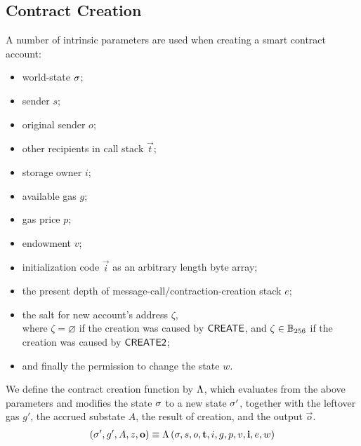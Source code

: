 \subsection{Contract Creation}
\label{sec:creation}

A number of intrinsic parameters are used when creating a smart contract account:
\begin{itemize}[nosep]
	\item world-state ${\mathbf{\sigma}}$;
	
	\item sender $s$;

	\item original sender $o$;
	
	\item other recipients in call stack $\vec{t}$;
	
	\item storage owner $i$;
		
	\item available gas $g$;


	\item gas price $p$;

	\item endowment $v$;

	\item initialization code $\vec{i}$ as an arbitrary length byte array;

	\item the present depth of message-call/contraction-creation stack $e$;

	\item the salt for new account's address $\zeta$,\\
	where $\zeta = \varnothing$ if the creation was caused by {\hyperlink{create}{$\mathsf{CREATE}$}}, 
	and $\zeta\in \mathbb{B}_{256}$ if the creation was caused by {\hyperlink{create2}{$\mathsf{CREATE2}$}};

	\item and finally the permission to change the state $w$.
\end{itemize}


We define the contract creation function by $\mathrm{\Lambda}$,
which evaluates from the above parameters and modifies the state $\mathbf{\sigma}$ to a new state $\mathbf{\sigma}'$, together with the leftover gas $g'$, the accrued substate $A$, the result of creation, and the output $\vec{o}$. 
\begin{align}
	\left(\mathbf{\sigma}',g', A, z, \mathbf{o} \right)\equiv \mathrm{\Lambda}\left(\mathbf{\sigma}, s, o, \mathbf{t},i, g, p, v, \mathbf{i}, e, w \right)
\end{align}


